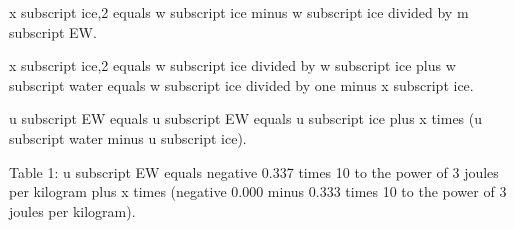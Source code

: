 x subscript ice,2 equals w subscript ice minus w subscript ice divided by m subscript EW.  

x subscript ice,2 equals w subscript ice divided by w subscript ice plus w subscript water equals w subscript ice divided by one minus x subscript ice.  

u subscript EW equals u subscript EW equals u subscript ice plus x times (u subscript water minus u subscript ice).  

Table 1: u subscript EW equals negative 0.337 times 10 to the power of 3 joules per kilogram plus x times (negative 0.000 minus 0.333 times 10 to the power of 3 joules per kilogram).